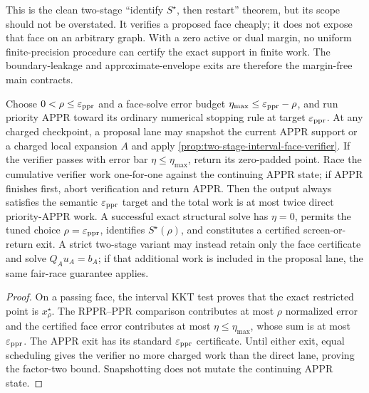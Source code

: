 This is the clean two-stage ``identify $S^\star$, then restart'' theorem, but
its scope should not be overstated.  It verifies a proposed face cheaply; it
does not expose that face on an arbitrary graph.  With a zero active or dual
margin, no uniform finite-precision procedure can certify the exact support
in finite work.  The boundary-leakage and approximate-envelope exits are
therefore the margin-free main contracts.

\begin{theorem}
\label{thm:two-stage-appr-face-race}
Choose $0<\rho\leq\varepsilon_{\mathrm{ppr}}$ and a face-solve error budget
$\eta_{\max}\leq\varepsilon_{\mathrm{ppr}}-\rho$, and run priority APPR toward its ordinary
numerical stopping rule at target $\varepsilon_{\mathrm{ppr}}$.  At any charged checkpoint, a proposal
lane may snapshot the current APPR support or a charged local expansion $A$
and apply \cref{prop:two-stage-interval-face-verifier}.  If the verifier
passes with error bar $\eta\leq\eta_{\max}$, return its zero-padded point.  Race
the cumulative verifier work one-for-one against the continuing APPR state;
if APPR finishes first, abort verification and return APPR.  Then the output
always satisfies the semantic $\varepsilon_{\mathrm{ppr}}$ target and the total work is at most
twice direct priority-APPR work.  A successful exact structural solve has
$\eta=0$, permits the tuned choice $\rho=\varepsilon_{\mathrm{ppr}}$, identifies
$S^\star(\rho)$, and constitutes a certified screen-or-return exit.  A
strict two-stage variant may instead retain only the face certificate and
solve $Q_Au_A=b_A$; if that additional work is included in the proposal lane,
the same fair-race guarantee applies.
\end{theorem}

\begin{proof}
On a passing face, the interval KKT test proves that the exact restricted
point is $x_\rho^\star$.  The RPPR--PPR comparison contributes at most
$\rho$ normalized error and the certified face error contributes at most
$\eta\leq\eta_{\max}$, whose sum is at most $\varepsilon_{\mathrm{ppr}}$.  The APPR exit has its standard
$\varepsilon_{\mathrm{ppr}}$ certificate.  Until either exit, equal scheduling gives the
verifier no more charged work than the direct lane, proving the factor-two
bound.  Snapshotting does not mutate the continuing APPR state.
\end{proof}


